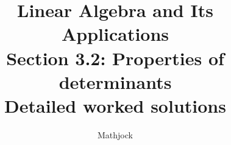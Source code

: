 
\title{\textbf{Linear Algebra and Its Applications}\\[0.3em]Section 3.2: Properties of determinants\\[0.3em]\large Detailed worked solutions}
\author{Mathjock}
\date{}

\maketitle
\bookinfo
\tableofcontents
\clearpage
\renewcommand{\thesection}{3.\arabic{section}}
\renewcommand{\theHsection}{3.\arabic{section}}
\setcounter{section}{1}


